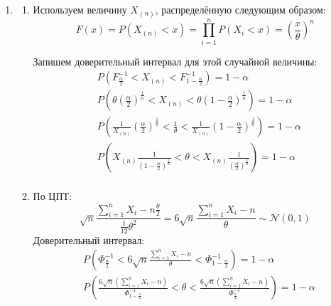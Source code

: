 \documentclass{article}
\begin{document}
\begin{enumerate}
	\item
	      \begin{enumerate}
		      \item Используем величину $X_{(n)}$, распределённую следующим образом:
		            \[
			            F(x) = P \left( X_{(n)} < x \right) = \prod_{i=1}^{n} P \left( X_i < x \right) = \left( \frac{x}{\theta} \right)^n
		            \]

		            Запишем доверительный интервал для этой случайной величины:
		            \begin{equation*}
			            \begin{aligned}
				             & P \left( F^{-1}_{\frac{\alpha}{2}} < X_{(n)} <  F^{-1}_{1 - \frac{\alpha}{2}} \right) = 1 - \alpha                                                                                     \\
				             & P \left( \theta \left( \frac{\alpha}{2} \right)^{\frac{1}{n}} < X_{(n)} < \theta \left( 1 - \frac{\alpha}{2} \right)^{\frac{1}{n}} \right) = 1 - \alpha                                \\
				             & P \left( \frac{1}{X_{(n)}} \left( \frac{\alpha}{2} \right)^{\frac{1}{n}} < \frac{1}{\theta} < \frac{1}{X_{(n)}} \left( 1 - \frac{\alpha}{2} \right)^{\frac{1}{n}} \right) = 1 - \alpha \\
				             & P \left( X_{(n)} \frac{1}{\left( 1 - \frac{\alpha}{2} \right)^{\frac{1}{n}}} < \theta < X_{(n)} \frac{1}{\left( \frac{\alpha}{2} \right)^{\frac{1}{n}}} \right) = 1 - \alpha           \\
			            \end{aligned}
		            \end{equation*}

		      \item По ЦПТ:
		            \[
			            \sqrt{n} \frac{\sum_{i=1}^n X_i - n \frac{\theta}{2}}{\frac{1}{12} \theta^2} = 6 \sqrt{n} \frac{\sum_{i=1}^n X_i - n}{\theta} \sim \mathcal{N}(0, 1)
		            \]
		            Доверительный интервал:
		            \begin{equation*}
			            \begin{aligned}
				             & P \left( \Phi_{\frac{\alpha}{2}}^{-1} < 6 \sqrt{n} \frac{\sum_{i=1}^n X_i - n}{\theta} < \Phi_{1 - \frac{\alpha}{2}}^{-1} \right) = 1 - \alpha                                                                       \\
				             & P \left( \frac{6 \sqrt{n} \left( \sum_{i=1}^n X_i - n \right)}{\Phi_{1 - \frac{\alpha}{2}}^{-1}} < \theta < \frac{6 \sqrt{n} \left( \sum_{i=1}^n X_i - n \right)}{\Phi_{\frac{\alpha}{2}}^{-1}} \right) = 1 - \alpha \\
			            \end{aligned}
		            \end{equation*}
	      \end{enumerate}


\end{enumerate}
\end{document}
